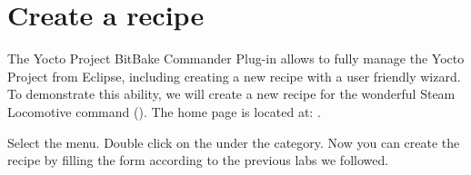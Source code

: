 

\section{Create a recipe}

The Yocto Project BitBake Commander Plug-in allows to fully manage the Yocto Project
from Eclipse, including creating a new recipe with a user friendly wizard. To
demonstrate this ability, we will create a new recipe for the wonderful Steam
Locomotive command (). The home page is located at:
.

Select the  menu. Double click on the  under the  category. Now you can
create the recipe by filling the form according to the previous labs we
followed.
